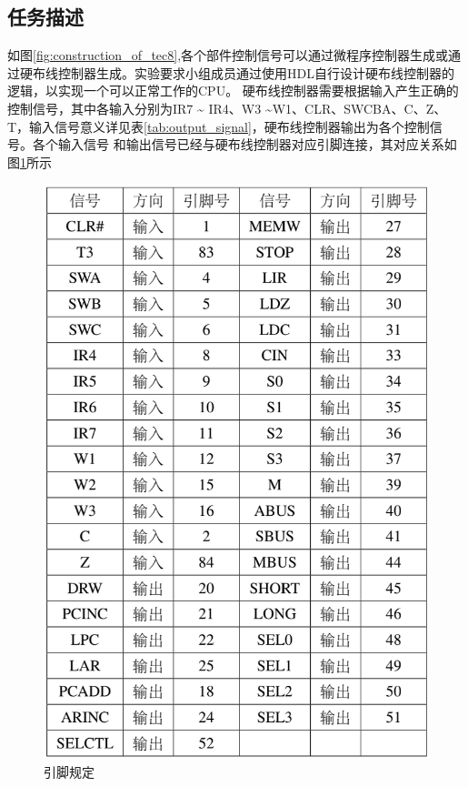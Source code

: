 \subsection{任务描述}

如图\ref{fig:construction_of_tec8},各个部件控制信号可以通过微程序控制器生成或通过硬布线控制器生成。实验要求小组成员通过使用HDL自行设计硬布线控制器的逻辑，以实现一个可以正常工作的CPU。
硬布线控制器需要根据输入产生正确的控制信号，其中各输入分别为IR7 \~{} IR4、W3 \~{}W1、CLR、SWCBA、C、Z、T，输入信号意义详见表\ref{tab:output_signal}，硬布线控制器输出为各个控制信号。各个输入信号
和输出信号已经与硬布线控制器对应引脚连接，其对应关系如图\ref{fig:pins}所示

\begin{figure}[htbp]
    \centering
    \includegraphics{figures/chapter1/pins.png}
    \caption{引脚规定}
    \label{fig:pins}
\end{figure}

